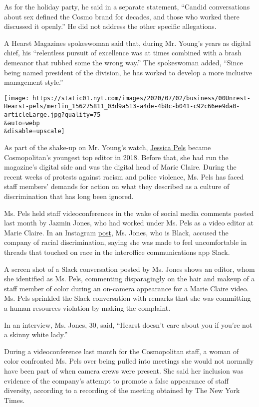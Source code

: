 As for the holiday party, he said in a separate statement, ``Candid
conversations about sex defined the Cosmo brand for decades, and those
who worked there discussed it openly.'' He did not address the other
specific allegations.

A Hearst Magazines spokeswoman said that, during Mr. Young's years as
digital chief, his ``relentless pursuit of excellence was at times
combined with a brash demeanor that rubbed some the wrong way.'' The
spokeswoman added, ``Since being named president of the division, he has
worked to develop a more inclusive management style.''

\texttt{[image: https://static01.nyt.com/images/2020/07/02/business/00Unrest-Hearst-pels/merlin\_156275811\_03d9a513-a4de-4b8c-b041-c92c66ee9da0-articleLarge.jpg?quality=75\\\&auto=webp\\\&disable=upscale]}

As part of the shake-up on Mr. Young's watch,
\href{https://www.nytimes.com/2019/04/05/style/cosmopolitan-magazine-jessica-pels.html}{Jessica
Pels} became Cosmopolitan's youngest top editor in 2018. Before that,
she had run the magazine's digital side and was the digital head of
Marie Claire. During the recent weeks of protests against racism and
police violence, Ms. Pels has faced staff members' demands for action on
what they described as a culture of discrimination that has long been
ignored.

Ms. Pels held staff videoconferences in the wake of social media
comments posted last month by Jazmin Jones, who had worked under Ms.
Pels as a video editor at Marie Claire. In an Instagram
\href{https://www.instagram.com/p/CBGjWu1jXQC/?utm_source=ig_web_copy_link}{post},
Ms. Jones, who is Black, accused the company of racial discrimination,
saying she was made to feel uncomfortable in threads that touched on
race in the interoffice communications app Slack.

A screen shot of a Slack conversation posted by Ms. Jones shows an
editor, whom she identified as Ms. Pels, commenting disparagingly on the
hair and makeup of a staff member of color during an on-camera
appearance for a Marie Claire video. Ms. Pels sprinkled the Slack
conversation with remarks that she was committing a human resources
violation by making the complaint.

In an interview, Ms. Jones, 30, said, ``Hearst doesn't care about you if
you're not a skinny white lady.''

During a videoconference last month for the Cosmopolitan staff, a woman
of color confronted Ms. Pels over being pulled into meetings she would
not normally have been part of when camera crews were present. She said
her inclusion was evidence of the company's attempt to promote a false
appearance of staff diversity, according to a recording of the meeting
obtained by The New York Times.

